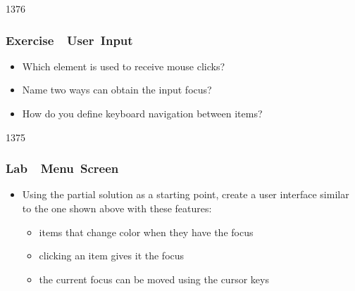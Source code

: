 \begin{slide}{1376}\frametitle{Exercise~\textendash~User~Input}

\begin{itemize}
\item Which element is used to receive mouse clicks?
\item Name two ways  can obtain the input focus?
\item How do you define keyboard navigation between items?
\end{itemize}

\end{slide}

\begin{slide}{1375}\frametitle{Lab~\textendash~Menu~Screen}


\begin{itemize}
\item Using the partial solution as a starting point, create a user interface
similar to the one shown above with these features:
  \begin{itemize}
  \item items that change color when they have the focus
  \item clicking an item gives it the focus
  \item the current focus can be moved using the cursor keys
  \end{itemize}
\end{itemize}       


\end{slide}                                 
